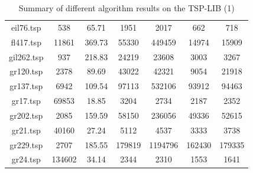 \documentclass[11pt, english]{article}
\begin{document}
\begin{table}[H]
\begin{tabular}{|c|c|c|c|c|c|c|}
		eil76.tsp & 538 & 65.71 & 1951 & 2017 & 662 & 718 \\
		fl417.tsp & 11861 & 369.73 & 55330 & 449459 & 14974 & 15909 \\
		gil262.tsp & 937 & 218.83 & 24219 & 23608 & 3003 & 3267 \\
		gr120.tsp & 2378 & 89.69 & 43022 & 42321 & 9054 & 21918 \\
		gr137.tsp & 6942 & 109.54 & 97113 & 532106 & 93912 & 94463 \\
		gr17.tsp & 69853 & 18.85 & 3204 & 2734 & 2187 & 2352 \\
		gr202.tsp & 2085 & 159.59 & 58150 & 236056 & 49336 & 52615 \\
		gr21.tsp & 40160 & 27.24 & 5112 & 4537 & 3333 & 3738 \\
		gr229.tsp & 2707 & 185.55 & 179819 & 1194796 & 162430 & 179335 \\
		gr24.tsp & 134602 & 34.14 & 2344 & 2310 & 1553 & 1641 \\
    \hline
	\end{tabular}
	\caption{Summary of different algorithm results on the TSP-LIB (1)}
	\label{table:allalgo_table1}
\end{table}
		
\end{document}
